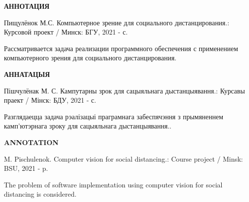 \begin{center}
     \large\bfseries{АННОТАЦИЯ}
\end{center}

Пищулёнок М.С. Компьютерное зрение для социального дистанцирования.: Курсовой проект / Минск: БГУ, 2021 - \pageref{LastPage} с.

Рассматривается задача реализации программного обеспечения с применением компьютерного зрения для социального дистанцирования.

\begin{center}
     \large\bfseries{АННАТАЦЫЯ}
\end{center}

Пішчулёнак М. С. Кампутарны зрок для сацыяльнага дыстанцыявання.: Курсавы праект / Мінск: БДУ, 2021 - \pageref{LastPage} с.

Разглядаецца задача рэалізацыі праграмнага забеспячэння з прымяненнем камп'ютэрнага зроку для сацыяльнага дыстанцыявання..

\begin{center}
     \large\bfseries{ANNOTATION}
\end{center}

M. Pischulenok. Computer vision for social distancing.: Course project / Minsk: BSU, 2021 - \pageref{LastPage} p.

The problem of software implementation using computer vision for social distancing is considered.

\newpage